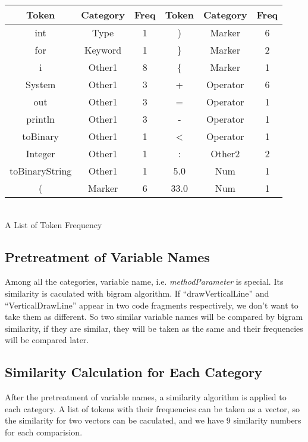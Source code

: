\documentclass[../main.tex]{subfiles}
\begin{document}
\begin{tablehere}
\footnotesize
\begin{tabular}[h]{|c|c|c||c|c|c|}
\hline
Token & Category & Freq 	& Token & Category & Freq\\
\hline
int & Type &1 		&  ) & Marker & 6\\
\hline
for & Keyword & 1 	& \} & Marker & 2\\
\hline
i & Other1 & 8		& \{ & Marker & 1\\
\hline
System & Other1 & 3	& + & Operator & 6\\
\hline
out & Other1 & 3	& = & Operator & 1\\
\hline
println & Other1 & 3	& - & Operator & 1\\
\hline
toBinary & Other1 & 1	& < & Operator & 1\\
\hline
Integer & Other1 & 1	& : & Other2 & 2\\
\hline
toBinaryString & Other1 & 1	& 5.0 & Num & 1\\
\hline
( & Marker & 6		& 33.0 & Num & 1\\
\hline
\end{tabular}\\
\caption{A List of Token Frequency}\label{tab:Table_1}
\end{tablehere}

\subsection{Pretreatment of Variable Names}

Among all the categories, variable name, i.e. \textit{methodParameter} is special. Its similarity is caculated with bigram algorithm. If ``drawVerticalLine'' and ``VerticalDrawLine'' appear in two code fragments respectively, we don't want to take them as different. So two similar variable names will be compared by bigram similarity, if they are similar, they will be taken as the same and their frequencies will be compared later.

\subsection{Similarity Calculation for Each Category}

After the pretreatment of variable names, a similarity algorithm is applied to each category. A list of tokens with their frequencies can be taken as a vector, so the similarity for two vectors can be caculated, and we have 9 similarity numbers for each comparision.
\end{document}
